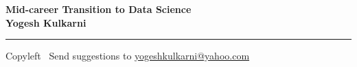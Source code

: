 
\graphicspath{{images/}}

\footnotesize


\begin{center}
\Large{\textbf{Mid-career Transition to Data Science\\ Yogesh Kulkarni}}  
\end{center}

\begin{multicols}{2}

\end{multicols}

\rule{\linewidth}{0.25pt}
\scriptsize
Copyleft \textcopyleft\  Send suggestions to 
\href{http://www.yogeshkulkarni.com}{yogeshkulkarni@yahoo.com}


